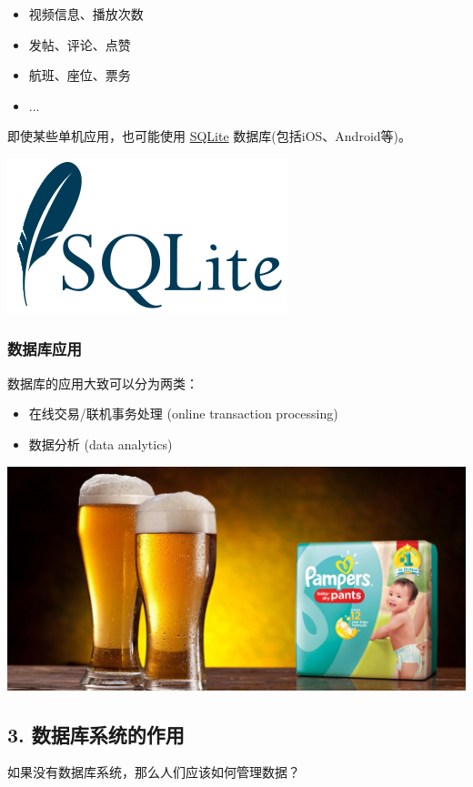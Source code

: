 \documentclass[aspectratio=169, 14pt]{beamer}
\begin{document}
\begin{frame}
    \begin{itemize}
        \item {} 视频信息、播放次数
        \item {} 发帖、评论、点赞
        \item {} 航班、座位、票务
        \item ...
    \end{itemize} 
    \pause
即使某些单机应用，也可能使用 \href{https://www.sqlite.org/famous.html}{SQLite} 数据库(包括iOS、Android等)。

\includegraphics[width=.3\paperwidth]{image/sqlite}

\end{frame}

\begin{frame}
    \frametitle{数据库应用}
    数据库的应用大致可以分为两类：
    \begin{itemize}
        \item 在线交易/联机事务处理 (online transaction processing)
        \item 数据分析 (data analytics)
    \end{itemize}   
\includegraphics[width=.5\textwidth]
{image/beer}

\end{frame}

\begin{frame}
    \section{\textcolor{darkmidnightblue}{3. 数据库系统的作用}}
    如果没有数据库系统，那么人们应该如何管理数据？
\end{frame}
\end{document}
